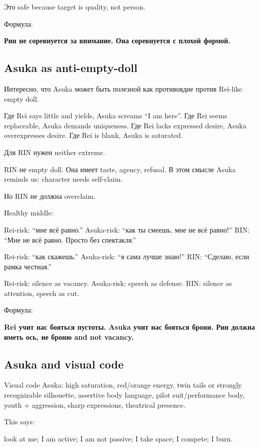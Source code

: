 Это safe because target is quality, not person.

Формула:

\textbf{Рин не соревнуется за внимание. Она соревнуется с плохой
формой.}

\subsection*{Asuka as anti-empty-doll}

Интересно, что Asuka может быть полезной как противоядие против Rei-like
empty doll.

Где Rei says little and yields, Asuka screams ``I am here''. Где Rei
seems replaceable, Asuka demands uniqueness. Где Rei lacks expressed
desire, Asuka overexpresses desire. Где Rei is blank, Asuka is
saturated.

Для RIN нужен neither extreme.

RIN не empty doll. Она имеет taste, agency, refusal. В этом смысле Asuka
reminds us: character needs self-claim.

Но RIN не должна overclaim.

Healthy middle:

Rei-risk: ``мне всё равно.'' Asuka-risk: ``как ты смеешь, мне не всё
равно!'' RIN: ``Мне не всё равно. Просто без спектакля.''

Rei-risk: ``как скажешь.'' Asuka-risk: ``я сама лучше знаю!'' RIN:
``Сделаю, если рамка честная.''

Rei-risk: silence as vacancy. Asuka-risk: speech as defense. RIN:
silence as attention, speech as cut.

Формула:

\textbf{Rei учит нас бояться пустоты. Asuka учит нас бояться брони. Рин
должна иметь ось, не броню and not vacancy.}

\subsection*{Asuka and visual code}

Visual code Asuka: high saturation, red/\hspace{0pt}orange energy, twin tails or
strongly recognizable silhouette, assertive body language, pilot
suit/\hspace{0pt}performance body, youth + aggression, sharp expressions, theatrical
presence.

This says:

look at me; I am active; I am not passive; I take space; I compete; I
burn.

